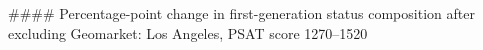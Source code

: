 #### Percentage-point change in first-generation status composition after excluding Geomarket: Los Angeles, PSAT score 1270–1520
